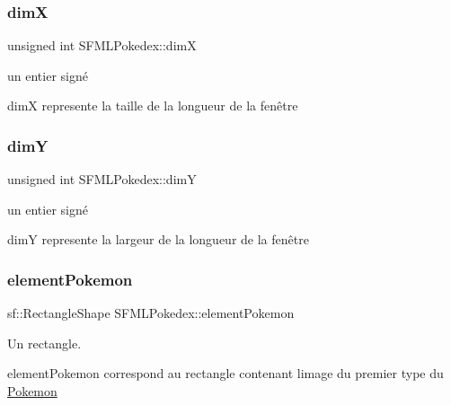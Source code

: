 \subsubsection{\texorpdfstring{dimX}{dimX}}
{\footnotesize\ttfamily unsigned int S\+F\+M\+L\+Pokedex\+::dimX\hspace{0.3cm}{\ttfamily [private]}}



un entier signé 

dimX represente la taille de la longueur de la fenêtre \mbox{\label{class_s_f_m_l_pokedex_a1b01bf762bbe23e56fe0f5a7a767871b}} 
\subsubsection{\texorpdfstring{dimY}{dimY}}
{\footnotesize\ttfamily unsigned int S\+F\+M\+L\+Pokedex\+::dimY\hspace{0.3cm}{\ttfamily [private]}}



un entier signé 

dimY represente la largeur de la longueur de la fenêtre \mbox{\label{class_s_f_m_l_pokedex_aa8a2ab411eb1fe32c6e803604e2bc089}} 
\subsubsection{\texorpdfstring{element\+Pokemon}{elementPokemon}}
{\footnotesize\ttfamily sf\+::\+Rectangle\+Shape S\+F\+M\+L\+Pokedex\+::element\+Pokemon\hspace{0.3cm}{\ttfamily [private]}}



Un rectangle. 

element\+Pokemon correspond au rectangle contenant l\textquotesingle{}image du premier type du \hyperlink{class_pokemon}{Pokemon} \mbox{\label{class_s_f_m_l_pokedex_a52190554b9cb690232c204cd1741e44e}} 
